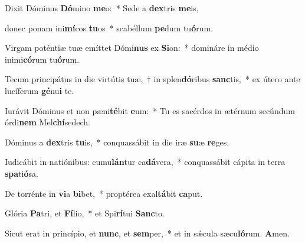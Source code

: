 \item Dixit Dóminus \textbf{Dó}mino \textbf{me}o:~* Sede a \textbf{dex}tris \textbf{me}is,

\item donec ponam ini\textbf{mí}cos \textbf{tu}os~* scabéllum \textbf{pe}dum tu\textbf{ó}rum.

\item Virgam poténtiæ tuæ emíttet Dómi\textbf{nus} ex \textbf{Si}on:~* domináre in médio inimi\textbf{có}rum tu\textbf{ó}rum.

\item Tecum principátus in die virtútis tuæ,~† in splen\textbf{dó}ribus \textbf{sanc}tis,~* ex útero ante lucíferum \textbf{gé}nu\textbf{i} te.

\item Iurávit Dóminus et non pæni\textbf{té}bit \textbf{e}um:~* Tu es sacérdos in ætérnum secúndum órdi\textbf{nem} Mel\textbf{chí}sedech.

\item Dóminus a \textbf{dex}tris \textbf{tu}is,~* conquassábit in die iræ \textbf{su}æ \textbf{re}ges.

\item Iudicábit in natiónibus: cumu\textbf{lán}tur ca\textbf{dá}vera,~* conquassábit cápita in terra \textbf{spa}ti\textbf{ó}sa.

\item De torrénte in \textbf{vi}a \textbf{bi}bet,~* proptérea exal\textbf{tá}bit \textbf{ca}put.

\item Glória \textbf{Pa}tri, et \textbf{Fí}lio,~* et Spi\textbf{rí}tui \textbf{Sanc}to.

\item Sicut erat in princípio, et \textbf{nunc}, et \textbf{sem}per,~* et in sǽcula sæcu\textbf{ló}rum. \textbf{A}men.
